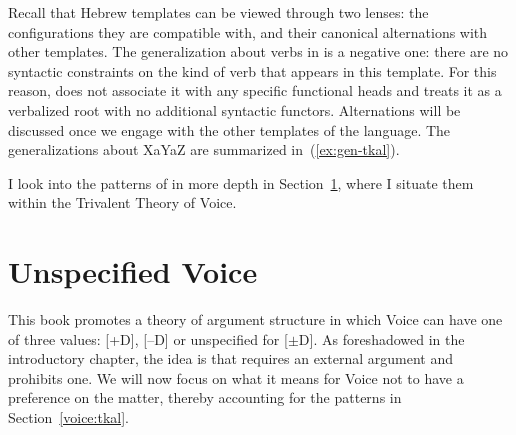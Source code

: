 \begin{exe}
\begin{xlist}
\begin{exe}
\begin{xlist}
\begin{exe}
\begin{xlist}
\begin{exe}
\begin{exe}
\begin{xlist}
\begin{exe}
\begin{xlist}
\begin{exe}
\begin{xlist}
\begin{exe}
\begin{xlist}
\begin{exe}
\begin{xlist}
\begin{exe}
\begin{xlist}
\begin{exe}
\begin{xlist}
\begin{exe}
\begin{xlist}
\begin{exe}
\begin{xlist}
\begin{exe}
\begin{xlist}
\begin{exe}
\begin{xlist}
Recall that Hebrew templates can be viewed through two lenses: the configurations they are compatible with, and their canonical alternations with other templates. The generalization about verbs in {\tkal} is a negative one: there are no syntactic constraints on the kind of verb that appears in this template. For this reason, \cite{doron03} does not associate it with any specific functional heads and \cite{borer13oup,borer15roots} treats it as a verbalized root with no additional syntactic functors. Alternations will be discussed once we engage with the other templates of the language. The generalizations about XaYaZ are summarized in~(\ref{ex:gen-tkal}).


I look into the patterns of {\tkal} in more depth in Section~\ref{voice:voice}, where I situate them within the Trivalent Theory of Voice.

\section{Unspecified Voice} \label{voice:voice}
This book promotes a theory of argument structure in which Voice can have one of three values: [\!+\!D], [--D] or unspecified for [$\pm$D]. As foreshadowed in the introductory chapter, the idea is that {\vd} requires an external argument and {\vz} prohibits one. We will now focus on what it means for Voice not to have a preference on the matter, thereby accounting for the patterns in Section~\ref{voice:tkal}.


\end{xlist}
\end{exe}
\end{xlist}
\end{exe}
\end{xlist}
\end{exe}
\end{xlist}
\end{exe}
\end{xlist}
\end{exe}
\end{xlist}
\end{exe}
\end{xlist}
\end{exe}
\end{xlist}
\end{exe}
\end{xlist}
\end{exe}
\end{xlist}
\end{exe}
\end{xlist}
\end{exe}
\end{exe}
\end{xlist}
\end{exe}
\end{xlist}
\end{exe}
\end{xlist}
\end{exe}
